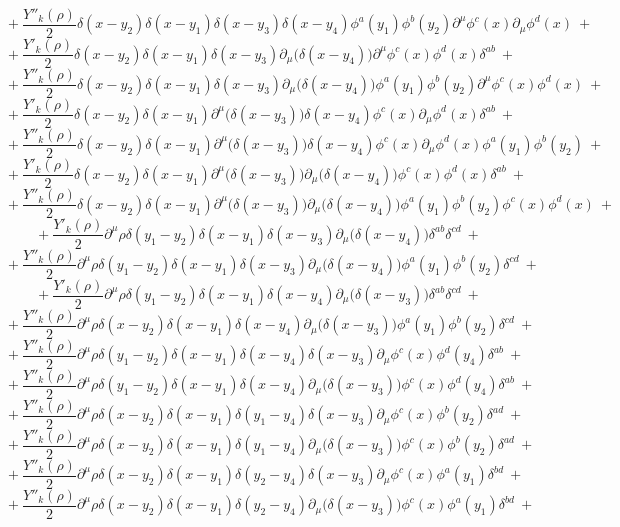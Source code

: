 $$+\ \frac{Y''_k(\rho)}{2}\delta(x - y_2)\delta(x - y_1)\delta(x - y_3)\delta(x - y_4)\phi^a(y_1)\phi^b(y_2)\partial^\mu\phi^c(x)\partial_\mu\phi^d(x)\ +$$
$$+\ \frac{Y'_k(\rho)}{2}\delta(x - y_2)\delta(x - y_1)\delta(x - y_3)\partial_\mu\big(\delta(x - y_4)\big)\partial^\mu\phi^c(x)\phi^d(x)\delta^{ab} \ +$$
$$+\ \frac{Y''_k(\rho)}{2}\delta(x - y_2)\delta(x - y_1)\delta(x - y_3)\partial_\mu\big(\delta(x - y_4)\big)\phi^a(y_1)\phi^b(y_2)\partial^\mu\phi^c(x)\phi^d(x)\ +$$
$$+\ \frac{Y'_k(\rho)}{2}\delta(x - y_2)\delta(x - y_1)\partial^\mu\big(\delta(x - y_3)\big)\delta(x - y_4)\phi^c(x)\partial_\mu\phi^d(x)\delta^{ab} \ +$$
$$+\ \frac{Y''_k(\rho)}{2}\delta(x - y_2)\delta(x - y_1)\partial^\mu\big(\delta(x - y_3)\big)\delta(x - y_4)\phi^c(x)\partial_\mu\phi^d(x)\phi^a(y_1)\phi^b(y_2) \ +$$
$$+\ \frac{Y'_k(\rho)}{2}\delta(x - y_2)\delta(x - y_1)\partial^\mu\big(\delta(x - y_3)\big)\partial_\mu\big(\delta(x - y_4)\big)\phi^c(x)\phi^d(x)\delta^{ab} \ +$$
$$+\ \frac{Y''_k(\rho)}{2}\delta(x - y_2)\delta(x - y_1)\partial^\mu\big(\delta(x - y_3)\big)\partial_\mu\big(\delta(x - y_4)\big)\phi^a(y_1)\phi^b(y_2)\phi^c(x)\phi^d(x) \ +$$
$$+\ \frac{Y'_k(\rho)}{2}\partial^\mu\rho\delta(y_1 - y_2)\delta(x - y_1)\delta(x - y_3)\partial_\mu\big(\delta(x - y_4)\big)\delta^{ab}\delta^{cd} \ +$$
$$+\ \frac{Y''_k(\rho)}{2}\partial^\mu\rho\delta(y_1 - y_2)\delta(x - y_1)\delta(x - y_3)\partial_\mu\big(\delta(x - y_4)\big)\phi^a(y_1)\phi^b(y_2)\delta^{cd} \ +$$
$$+\ \frac{Y'_k(\rho)}{2}\partial^\mu\rho\delta(y_1 - y_2)\delta(x - y_1)\delta(x - y_4)\partial_\mu\big(\delta(x - y_3)\big)\delta^{ab}\delta^{cd} \ +$$
$$+\ \frac{Y''_k(\rho)}{2}\partial^\mu\rho\delta(x - y_2)\delta(x - y_1)\delta(x - y_4)\partial_\mu\big(\delta(x - y_3)\big)\phi^a(y_1)\phi^b(y_2)\delta^{cd} \ +$$
$$+\ \frac{Y''_k(\rho)}{2}\partial^\mu\rho\delta(y_1 - y_2)\delta(x - y_1)\delta(x - y_4)\delta(x - y_3)\partial_\mu\phi^c(x)\phi^d(y_4)\delta^{ab} \ +$$
$$+\ \frac{Y''_k(\rho)}{2}\partial^\mu\rho\delta(y_1 - y_2)\delta(x - y_1)\delta(x - y_4)\partial_\mu\big(\delta(x - y_3)\big)\phi^c(x)\phi^d(y_4)\delta^{ab} \ +$$
$$+\ \frac{Y''_k(\rho)}{2}\partial^\mu\rho\delta(x - y_2)\delta(x - y_1)\delta(y_1 - y_4) \delta(x - y_3)\partial_\mu\phi^c(x)\phi^b(y_2)\delta^{ad} \ +$$
$$+\ \frac{Y''_k(\rho)}{2}\partial^\mu\rho\delta(x - y_2)\delta(x - y_1)\delta(y_1 - y_4) \partial_\mu\big(\delta(x - y_3)\big)\phi^c(x)\phi^b(y_2)\delta^{ad} \ +$$
$$+\ \frac{Y''_k(\rho)}{2}\partial^\mu\rho\delta(x - y_2)\delta(x - y_1)\delta(y_2 - y_4) \delta(x - y_3)\partial_\mu\phi^c(x)\phi^a(y_1)\delta^{bd} \ +$$
$$+\ \frac{Y''_k(\rho)}{2}\partial^\mu\rho\delta(x - y_2)\delta(x - y_1)\delta(y_2 - y_4) \partial_\mu\big(\delta(x - y_3)\big)\phi^c(x)\phi^a(y_1)\delta^{bd} \ +$$
